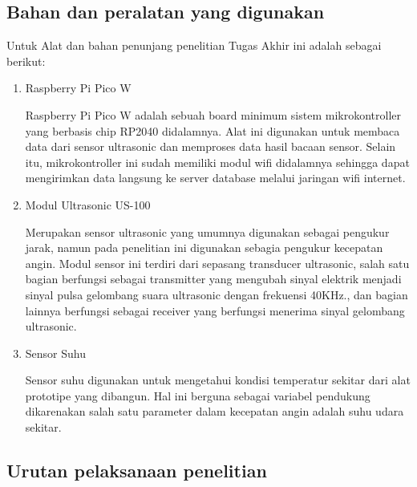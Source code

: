 \subsection{Bahan dan peralatan yang digunakan}

Untuk Alat dan bahan penunjang penelitian Tugas Akhir ini adalah sebagai berikut:
\begin{enumerate}
  \item Raspberry Pi Pico W
  
  Raspberry Pi Pico W adalah sebuah board minimum sistem mikrokontroller yang berbasis chip RP2040 didalamnya. 
  Alat ini digunakan untuk membaca data dari sensor ultrasonic dan memproses data hasil bacaan sensor. Selain itu, 
  mikrokontroller ini sudah memiliki modul wifi didalamnya sehingga dapat mengirimkan data langsung ke server database 
  melalui jaringan wifi internet.

  \item Modul Ultrasonic US-100
  
  Merupakan sensor ultrasonic yang umumnya digunakan sebagai pengukur jarak, namun pada penelitian ini digunakan sebagia
  pengukur kecepatan angin. Modul sensor ini terdiri dari sepasang transducer ultrasonic, salah satu bagian berfungsi sebagai 
  transmitter yang mengubah sinyal elektrik menjadi sinyal pulsa gelombang suara ultrasonic dengan frekuensi 40KHz., dan bagian lainnya 
  berfungsi sebagai receiver yang berfungsi menerima sinyal gelombang ultrasonic.
  \item Sensor Suhu
  
  Sensor suhu digunakan untuk mengetahui kondisi temperatur sekitar dari alat prototipe yang dibangun. Hal ini berguna sebagai variabel 
  pendukung dikarenakan salah satu parameter dalam kecepatan angin adalah suhu udara sekitar.
\end{enumerate}

\subsection{Urutan pelaksanaan penelitian}

